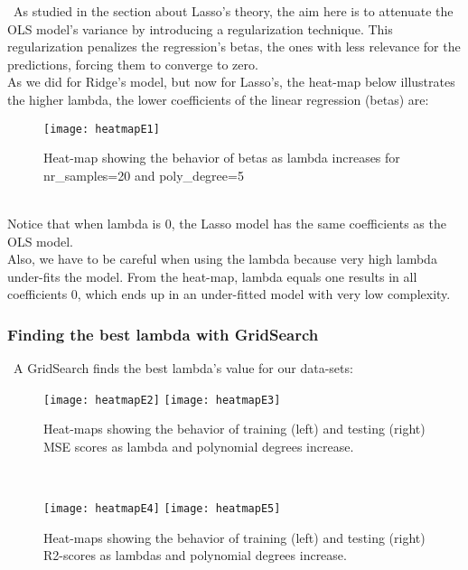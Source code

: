\quad \, As studied in the section about Lasso's theory, the aim here is to attenuate the OLS model's variance by introducing a regularization technique. This regularization penalizes the regression's betas, the ones with less relevance for the predictions, forcing them to converge to zero. \\

As we did for Ridge's model, but now for Lasso's, the heat-map below illustrates the higher lambda, the lower coefficients of the linear regression (betas) are: \\

\begin{figure}[h]
\label{fig:heatmapE1}
\centering
\texttt{[image: heatmapE1]}
\caption{Heat-map showing the behavior of betas as lambda increases for nr\_samples=20 and poly\_degree=5}
\end{figure}\\

Notice that when lambda is 0, the Lasso model has the same coefficients as the OLS model. \\

Also, we have to be careful when using the lambda because very high lambda under-fits the model. From the heat-map, lambda equals one results in all coefficients 0, which ends up in an under-fitted model with very low complexity. \\

\subsubsection{Finding the best lambda with GridSearch}
\label{chap:Finding the best lambda with GridSearch}

\quad \, A GridSearch finds the best lambda's value for our data-sets: \\

\begin{figure}[H]
\label{fig:heatmapE2andE3}
\texttt{[image: heatmapE2]}
\texttt{[image: heatmapE3]}
\caption{Heat-maps showing the behavior of training (left) and testing (right) MSE scores as lambda and polynomial degrees increase.}
\centering
\end{figure}\\

\begin{figure}[H]
\label{fig:heatmapE4andE5}
\texttt{[image: heatmapE4]}
\texttt{[image: heatmapE5]}
\caption{Heat-maps showing the behavior of training (left) and testing (right) R2-scores as lambdas and polynomial degrees increase.}
\centering
\end{figure}\\

